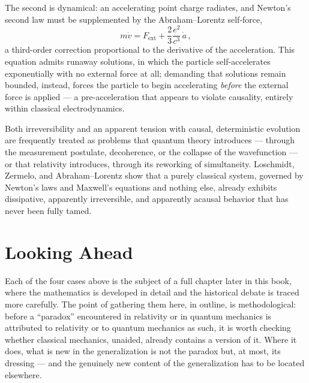 The second is dynamical: an accelerating point charge radiates, and Newton's
second law must be supplemented by the Abraham--Lorentz self-force,
\begin{equation}
  m\dot v = F_{\text{ext}} + \frac{2}{3}\frac{e^2}{c^3}\,\dot a \, ,
\end{equation}
a third-order correction proportional to the derivative of the acceleration.
This equation admits runaway solutions, in which the particle self-accelerates
exponentially with no external force at all; demanding that solutions remain
bounded, instead, forces the particle to begin accelerating \emph{before} the
external force is applied --- a pre-acceleration that appears to violate
causality, entirely within classical electrodynamics.

Both irreversibility and an apparent tension with causal, deterministic
evolution are frequently treated as problems that quantum theory introduces
--- through the measurement postulate, decoherence, or the collapse of the
wavefunction --- or that relativity introduces, through its reworking of
simultaneity. Loschmidt, Zermelo, and Abraham--Lorentz show that a purely
classical system, governed by Newton's laws and Maxwell's equations and nothing
else, already exhibits dissipative, apparently irreversible, and apparently
acausal behavior that has never been fully tamed.

\section{Looking Ahead}

Each of the four cases above is the subject of a full chapter later in this
book, where the mathematics is developed in detail and the historical debate is
traced more carefully. The point of gathering them here, in outline, is
methodological: before a ``paradox'' encountered in relativity or in quantum
mechanics is attributed to relativity or to quantum mechanics as such, it is
worth checking whether classical mechanics, unaided, already contains a version
of it. Where it does, what is new in the generalization is not the paradox but,
at most, its dressing --- and the genuinely new content of the generalization
has to be located elsewhere.

